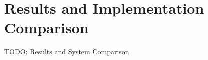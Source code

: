 \documentclass[./main.tex]{subfiles}
\begin{document}
\section{Results and Implementation Comparison}
\label{sec:results_comparison}
TODO: Results and System Comparison
\end{document}
